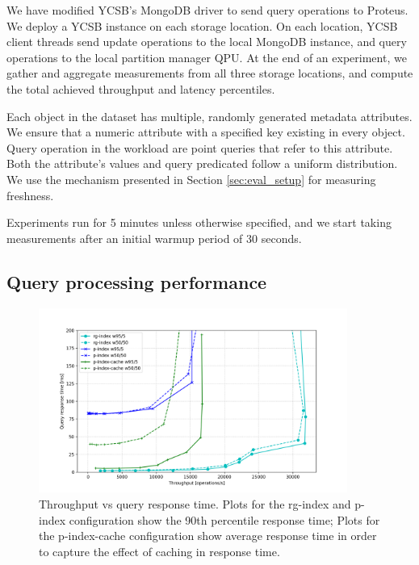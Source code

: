 We have modified YCSB's MongoDB driver to send query operations to Proteus.
We deploy a YCSB instance on each storage location.
On each location, YCSB client threads send update operations to the local MongoDB instance,
and query operations to the local partition manager QPU.
At the end of an experiment, we gather and aggregate measurements from all three storage locations,
and compute the total achieved throughput and latency percentiles.

Each object in the dataset has multiple, randomly generated metadata attributes.
We ensure that a numeric attribute with a specified key existing in every object.
Query operation in the workload are point queries that refer to this attribute.
Both the attribute's values and query predicated follow a uniform distribution.
We use the mechanism presented in Section \ref{sec:eval_setup} for measuring freshness.

Experiments run for 5 minutes unless otherwise specified, and we start taking measurements after an initial
warmup period of 30 seconds.

\subsection{Query processing performance}

\begin{figure}[H]
\centering
  \includegraphics[width=0.9\textwidth]{./figures/evaluation/ycsb_responseTime.png}
  \caption{Throughput vs query response time. Plots for the rg-index and p-index configuration show the 90th percentile response time;
  Plots for the p-index-cache configuration show average response time in order to capture the effect of caching in response time.}
  \label{fig:ycsb_responseTime}
\end{figure}

